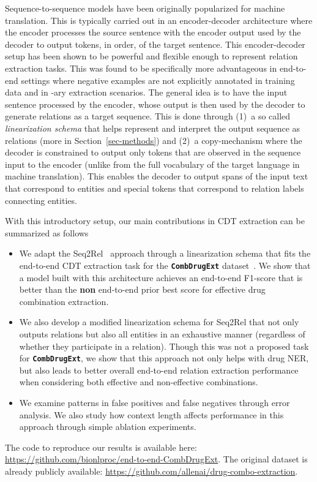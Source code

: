 \documentclass[conference]{IEEEtran}
\begin{document}
Sequence-to-sequence models have been originally popularized for machine translation. This is typically carried out in an encoder-decoder  architecture where the encoder processes the source sentence with the encoder output used by the decoder to output tokens, in order, of the target sentence. This encoder-decoder setup has been shown to be powerful and flexible enough to represent relation extraction tasks. This was found to be specifically more advantageous in end-to-end settings where negative examples are not explicitly annotated in training data and in -ary extraction scenarios. The general idea is to have the input sentence processed by the encoder, whose output is then used by the decoder to generate relations as a target sequence.
This is done through (1)~a so called \textit{linearization schema} that helps  represent and interpret the output sequence as relations (more in Section~\ref{sec-methods}) and (2)~a copy-mechanism where the decoder is constrained to output only tokens that are observed in the sequence input to the encoder (unlike from the full vocabulary of the target language in  machine translation). This enables the decoder to output spans of the input text that correspond to entities and special tokens that correspond to relation labels connecting entities. 

With this introductory setup, our main contributions in CDT extraction can be summarized as follows 
\begin{itemize}
\item We adapt the Seq2Rel~\cite{giorgi-etal-2022-sequence} approach through a  linearization schema that fits the end-to-end CDT extraction task  for the \textbf{\texttt{CombDrugExt}} dataset~\cite{tiktinsky-etal-2022-dataset}. We show that a model built with this architecture achieves an end-to-end F1-score that is  better than the \textbf{non} end-to-end prior best score for effective drug combination extraction. 
\item We also develop a modified linearization schema for Seq2Rel that not only outputs relations but also all entities in an exhaustive manner (regardless of whether they participate in a relation). Though this was not a proposed task for \textbf{\texttt{CombDrugExt}}, we show that this approach not only helps with drug NER, but also leads to better  overall end-to-end relation extraction performance  when considering both effective and non-effective combinations. 
\item We examine patterns in   false positives and false negatives through error analysis. We also study how context length affects performance in this approach through simple ablation experiments. 
\end{itemize}
The code to  reproduce our results is available here: \url{https://github.com/bionlproc/end-to-end-CombDrugExt}. The original dataset is already publicly available: \url{https://github.com/allenai/drug-combo-extraction}.
\end{document}
